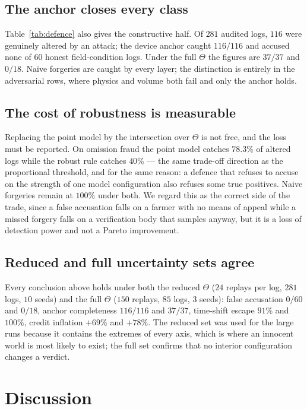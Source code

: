 \documentclass[journal]{IEEEtran}
\begin{document}
\subsection{The anchor closes every class}

Table~\ref{tab:defence} also gives the constructive half. Of $281$ audited logs,
$116$ were genuinely altered by an attack; the device anchor caught $116/116$ and
accused none of $60$ honest field-condition logs. Under the full $\Theta$ the
figures are $37/37$ and $0/18$. Naive forgeries are caught by every layer; the
distinction is entirely in the adversarial rows, where physics and volume both
fail and only the anchor holds.

\subsection{The cost of robustness is measurable}

Replacing the point model by the intersection over $\Theta$ is not free, and the
loss must be reported. On omission fraud the point model catches $78.3\%$ of
altered logs while the robust rule catches $40\%$ --- the same trade-off direction
as the proportional threshold, and for the same reason: a defence that refuses to
accuse on the strength of one model configuration also refuses some true
positives. Naive forgeries remain at $100\%$ under both. We regard this as the
correct side of the trade, since a false accusation falls on a farmer with no
means of appeal while a missed forgery falls on a verification body that samples
anyway, but it is a loss of detection power and not a Pareto improvement.

\subsection{Reduced and full uncertainty sets agree}

Every conclusion above holds under both the reduced $\Theta$ ($24$ replays per
log, $281$ logs, $10$ seeds) and the full $\Theta$ ($150$ replays, $85$ logs,
$3$ seeds): false accusation $0/60$ and $0/18$, anchor completeness $116/116$ and
$37/37$, time-shift escape $91\%$ and $100\%$, credit inflation $+69\%$ and
$+78\%$. The reduced set was used for the large runs because it contains the
extremes of every axis, which is where an innocent world is most likely to exist;
the full set confirms that no interior configuration changes a verdict.

\section{Discussion}
\label{sec:discussion}
\end{document}
